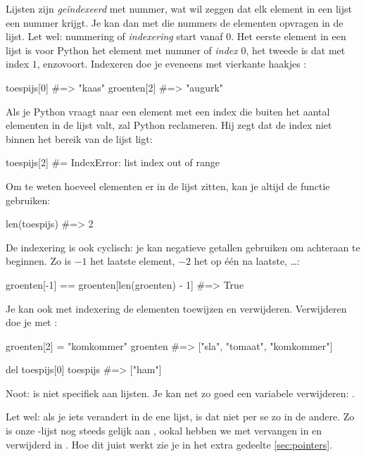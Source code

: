   Lijsten zijn \emph{ge\"indexeerd} met nummer, wat wil zeggen dat elk element
  in een lijst een nummer krijgt. Je kan dan met die nummers de elementen
  opvragen in de lijst. Let wel: nummering of \emph{indexering} start vanaf $0$.
  Het eerste element in een lijst is voor Python het element met nummer of
  \emph{index} $0$, het tweede is dat met index $1$, enzovoort. Indexeren doe je
  eveneens met vierkante haakjes \py{[\,]}:
  \begin{python}
    toespijs[0]   #=> "kaas"
    groenten[2]   #=> "augurk"
  \end{python}
  Als je Python vraagt naar een element met een index die buiten het aantal
  elementen in de lijst valt, zal Python reclameren. Hij zegt dat de index niet
  binnen het bereik van de lijst ligt:
  \begin{python}
    toespijs[2]   #= IndexError: list index out of range
  \end{python}
  Om te weten hoeveel elementen er in de lijst zitten, kan je altijd de functie
   gebruiken:
  \begin{python}
    len(toespijs) #=> 2
  \end{python}
  De indexering is ook cyclisch: je kan negatieve getallen gebruiken om
  achteraan te beginnen. Zo is $-1$ het laatste element, $-2$ het op \'e\'en na
  laatste, \ldots:
  \begin{python}
    groenten[-1] == groenten[len(groenten) - 1] #=> True
  \end{python}
  Je kan ook met indexering de elementen toewijzen en verwijderen.
  Verwijderen doe je met :
  \begin{python}
    groenten[2] = "komkommer"
    groenten  #=> ["sla", "tomaat", "komkommer"]

    del toespijs[0]
    toespijs  #=> ["ham"]
  \end{python}
  Noot:  is niet specifiek aan lijsten. Je kan net zo goed een variabele
  verwijderen: .

  Let wel: als je iets verandert in de ene lijst, is dat niet per se zo in de
  andere. Zo is onze -lijst nog steeds gelijk aan , ookal hebben we
   met  vervangen in  en
   verwijderd in . Hoe dit juist werkt zie je in het
  extra gedeelte \ref{sec:pointers}.

